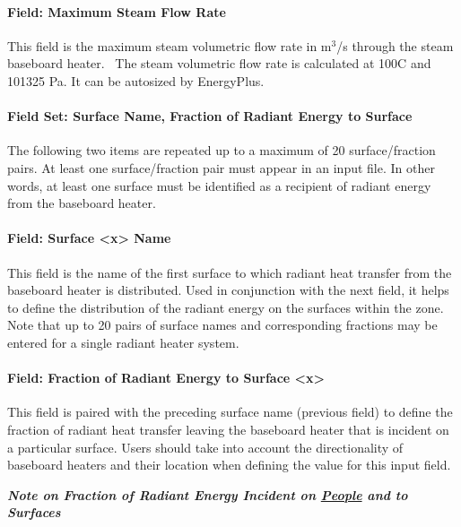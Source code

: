 \paragraph{Field: Maximum Steam Flow Rate}\label{field-maximum-steam-flow-rate-000}

This field is the maximum steam volumetric flow rate in m\(^{3}\)/s through the steam baseboard heater.~ The steam volumetric flow rate is calculated at 100C and 101325 Pa. It can be autosized by EnergyPlus.

\paragraph{Field Set: Surface Name, Fraction of Radiant Energy to Surface}\label{field-set-surface-name-fraction-of-radiant-energy-to-surface-1}

The following two items are repeated up to a maximum of 20 surface/fraction pairs. At least one surface/fraction pair must appear in an input file. In other words, at least one surface must be identified as a recipient of radiant energy from the baseboard heater.

\paragraph{Field: Surface \textless{}x\textgreater{} Name}\label{field-surface-x-name-1}

This field is the name of the first surface to which radiant heat transfer from the baseboard heater is distributed. Used in conjunction with the next field, it helps to define the distribution of the radiant energy on the surfaces within the zone. Note that up to 20 pairs of surface names and corresponding fractions may be entered for a single radiant heater system.

\paragraph{Field: Fraction of Radiant Energy to Surface \textless{}x\textgreater{}}\label{field-fraction-of-radiant-energy-to-surface-x-1}

This field is paired with the preceding surface name (previous field) to define the fraction of radiant heat transfer leaving the baseboard heater that is incident on a particular surface. Users should take into account the directionality of baseboard heaters and their location when defining the value for this input field.

\textbf{\emph{Note on Fraction of Radiant Energy Incident on \hyperref[people]{People} and to Surfaces}}

